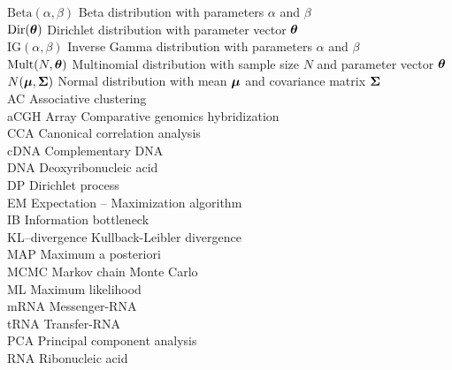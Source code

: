 $\text{Beta}(\alpha, \beta)$ \hfill Beta distribution with parameters $\alpha$ and $\beta$ \\
$\text{Dir}(\boldsymbol{\theta})$ \hfill Dirichlet distribution with parameter vector $\boldsymbol{\theta}$ \\
$\text{IG}(\alpha,\beta)$ \hfill Inverse Gamma distribution with parameters $\alpha$ and $\beta$ \\
$\text{Mult}(N,\boldsymbol{\theta})$ \hfill Multinomial distribution with sample size $N$ and parameter vector $\boldsymbol{\theta}$ \\
$N(\boldsymbol{\mu},\boldsymbol{\Sigma})$ \hfill Normal distribution with mean $\boldsymbol{\mu}$ and covariance matrix $\boldsymbol{\Sigma}$ \\
AC			 \hfill Associative clustering \\
aCGH                     \hfill Array Comparative genomics hybridization \\
CCA                      \hfill Canonical correlation analysis \\
cDNA                     \hfill Complementary DNA\\
DNA                      \hfill Deoxyribonucleic acid \\
DP                       \hfill Dirichlet process \\
EM                       \hfill Expectation -- Maximization algorithm \\
IB                       \hfill Information bottleneck \\
KL--divergence		 \hfill Kullback-Leibler divergence \\
MAP                      \hfill Maximum a posteriori \\
MCMC                     \hfill Markov chain Monte Carlo\\
ML                       \hfill Maximum likelihood \\
mRNA                     \hfill Messenger-RNA\\
tRNA                     \hfill Transfer-RNA\\
PCA                      \hfill Principal component analysis \\
RNA                      \hfill Ribonucleic acid\\

